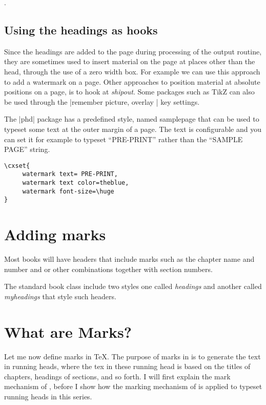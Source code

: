 . 



\subsection{Using the headings as hooks}

Since the headings are added to the page during processing of the output routine, they are sometimes used
to insert material on the page at places other than the head, through the use of a zero width box. For example we
can use this approach to add a watermark on a page. Other approaches to position material at absolute positions
on a page, is to hook at \emph{shipout}. Some packages such as TikZ can also be used through the |remember picture, overlay |  key settings. 

The |phd| package has a predefined style, named samplepage that can be used to typeset some text at the outer margin of a page. The text is configurable and you can set it for example to typeset “PRE-PRINT” rather than the “SAMPLE PAGE” string. 

\begin{tcolorbox}
\begin{lstlisting}
\cxset{
     watermark text= PRE-PRINT,
     watermark text color=theblue,
     watermark font-size=\huge
}
\end{lstlisting}
\end{tcolorbox}

\makeatletter
{}
\makeatother

   
\thispagestyle{samplepage}


\section{Adding marks}

Most books will have headers that include marks such as the chapter name and number and or other combinations together with section numbers.

The standard book class include two styles one called \textit{headings} and another called \textit{myheadings} that style such headers.


\section{What are Marks?}

Let me now define marks in TeX. The purpose of marks in \tex is to generate 
the text in running heads, where the tex in these running head is based on the 
titles of chapters, headings of sections, and so forth. I will first explain the mark 
mechanism of \tex, before I show how the marking mechanism of \tex is applied 
to typeset running heads in this series. 

